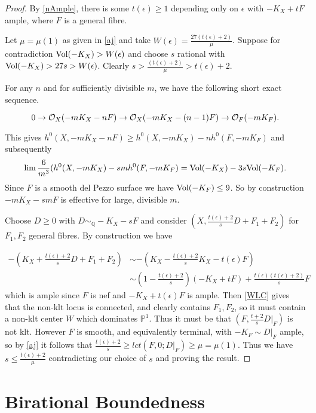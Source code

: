 \begin{proof}
	By \autoref{nAmple}, there is some $t(\epsilon)\geq 1$ depending only on $\epsilon$ with $-K_{X}+tF$ ample, where $F$ is a general fibre.
	
	Let $\mu=\mu(1)$ as given in \autoref{aj} and take $W(\epsilon)= \frac{27(t(\epsilon)+2)}{\mu}$. Suppose for contradiction $\text{Vol}(-K_{X}) > W(\epsilon)$ and choose $s$ rational with $\text{Vol}(-K_{X}) > 27s > W(\epsilon)$. Clearly $s > \frac{(t(\epsilon)+2)}{\mu} > t(\epsilon)+2$. 
	
	For any $n$ and for sufficiently divisible $m$, we have the following short exact sequence.
	
	\[0 \to \mathcal{O}_{X} (-mK_{X}-nF) \to \mathcal{O}_{X}(-mK_{X}-(n-1)F) \to \mathcal{O}_{F}(-mK_{F}).\]
	
	This gives $h^{0}(X,-mK_{X}-nF) \geq h^{0}(X,-mK_{X})-nh^{0}(F,-mK_{F})$ and subsequently 
	\[\lim \frac{6}{m^{3}}(h^{0}(X,-mK_{X})-smh^{0}(F,-mK_{F})= \text{Vol}(-K_{X})-3s\text{Vol}(-K_{F}).\] Since $F$ is a smooth del Pezzo surface we have $\text{Vol}(-K_{F})\leq 9$.  So by construction $-mK_{X}-smF$ is effective for large, divisible $m$. 
	
	Choose $D\geq 0$ with $D \sim_{\mathbb{Q}} -K_{X}-sF$ and consider $(X,\frac{t(\epsilon)+2}{s}D+F_{1}+F_{2})$ for $F_{1},F_{2}$ general fibres. By construction we have
	
	\begin{align*}
	-(K_{X}+\frac{t(\epsilon)+2}{s}D+F_{1}+F_{2})&\sim -(K_{X}-\frac{t(\epsilon)+2}{s}K_{X}-t(\epsilon)F)\\
	&\sim (1-\frac{t(\epsilon)+2}{s})(-K_{X}+tF) + \frac{t(\epsilon)(t(\epsilon)+2)}{s}F
	\end{align*}
	which is ample since $F$ is nef and $-K_{X}+t(\epsilon)F$ is ample.
	Then \autoref{WLC} gives that the non-klt locus is connected, and clearly contains $F_{1},F_{2}$, so it must contain a non-klt center $W$ which dominates $\mathbb{P}^{1}$. Thus it must be that $(F,\frac{t+2}{s}D|_{F})$ is not klt. However $F$ is smooth, and equivalently terminal, with $-K_{F}\sim D|_{F}$ ample, so by \autoref{aj} it follows that $\frac{t(\epsilon)+2}{s} \geq lct(F,0;D|_{F}) \geq \mu=\mu(1)$. Thus we have $s \leq \frac{t(\epsilon)+2}{\mu}$ contradicting our choice of $s$ and proving the result.
\end{proof}


\section{Birational Boundedness}

